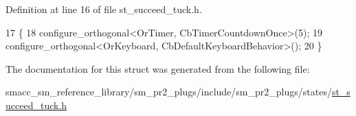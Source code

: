 Definition at line 16 of file st\+\_\+succeed\+\_\+tuck.\+h.


\begin{DoxyCode}
17     \{
18         configure\_orthogonal<OrTimer,  CbTimerCountdownOnce>(5);    
19         configure\_orthogonal<OrKeyboard, CbDefaultKeyboardBehavior>();
20     \}
\end{DoxyCode}


The documentation for this struct was generated from the following file\+:\begin{DoxyCompactItemize}
\item 
smacc\+\_\+sm\+\_\+reference\+\_\+library/sm\+\_\+pr2\+\_\+plugs/include/sm\+\_\+pr2\+\_\+plugs/states/\hyperlink{st__succeed__tuck_8h}{st\+\_\+succeed\+\_\+tuck.\+h}\end{DoxyCompactItemize}
